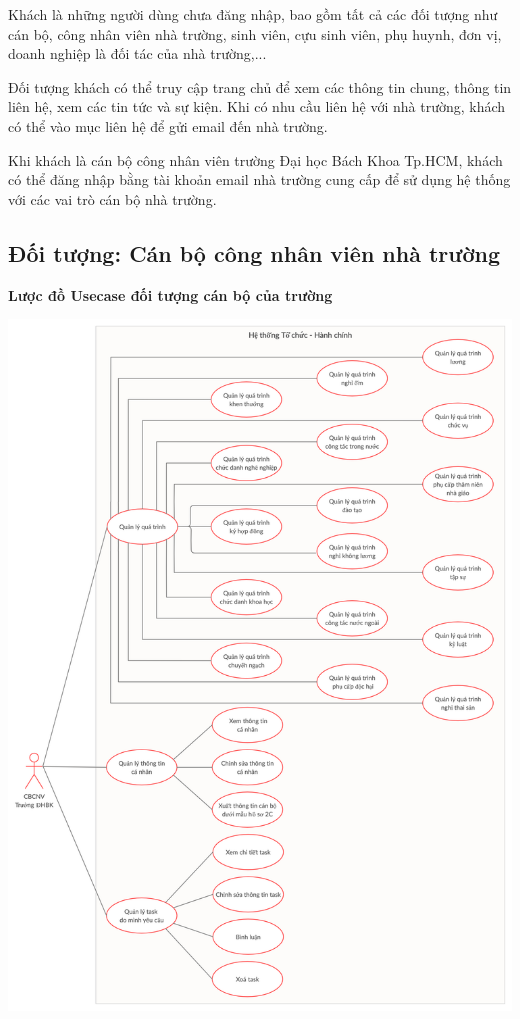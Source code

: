 Khách là những người dùng chưa đăng nhập, bao gồm tất cả các đối tượng như cán bộ,  công nhân viên nhà trường, sinh viên, cựu sinh viên, phụ huynh, đơn vị, doanh nghiệp là đối tác của nhà trường,...
 
 Đối tượng khách có thể truy cập trang chủ để xem các thông tin chung, thông tin liên hệ, xem các tin tức và sự kiện. Khi có nhu cầu liên hệ với nhà trường, khách có thể vào mục liên hệ để gửi email đến nhà trường.
 
 Khi khách là cán bộ công nhân viên trường Đại học Bách Khoa Tp.HCM, khách có thể đăng nhập bằng tài khoản email nhà trường cung cấp để sử dụng hệ thống với các vai trò cán bộ nhà trường.

\subsection{Đối tượng: Cán bộ công nhân viên nhà trường}
\textbf{Lược đồ Usecase đối tượng cán bộ của trường}
\begin{center}
  \captionsetup{type=figure}
  \includegraphics[width=15cm]{img/usecase/userUsecase.png}
\end{center}


